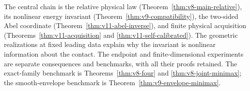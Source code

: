 The central chain is the relative physical law
(Theorem~\ref{thm:v8-main-relative}), its nonlinear energy invariant
(Theorem~\ref{thm:v9-compatibility}), the two-sided Abel coordinate
(Theorem~\ref{thm:v11-abel-inverse}), and finite physical acquisition
(Theorems~\ref{thm:v11-acquisition} and
\ref{thm:v11-self-calibrated}). The geometric realizations at fixed
leading data explain why the invariant is nonlinear information about
the contact. The endpoint and finite-dimensional experiments are
separate consequences and benchmarks, with all their proofs retained.
The exact-family benchmark is Theorems~\ref{thm:v8-four} and
\ref{thm:v8-joint-minimax}; the smooth-envelope benchmark is
Theorem~\ref{thm:v9-envelope-minimax}.

